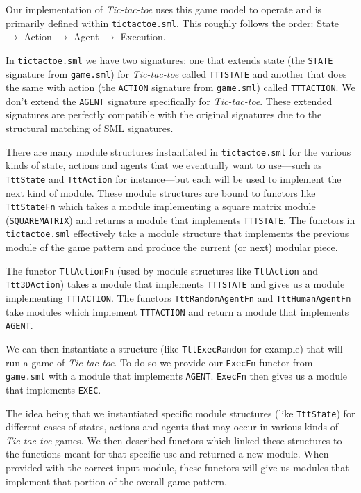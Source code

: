 \documentclass[9pt,letterpaper]{extarticle}
\begin{document}
  Our implementation of \textit{Tic-tac-toe} uses this game model to operate and
  is primarily defined within \texttt{tictactoe.sml}.
  This roughly follows the order:
  State $\rightarrow$ Action $\rightarrow$ Agent $\rightarrow$ Execution.

  In \texttt{tictactoe.sml} we have two signatures: one that extends state
  (the \texttt{STATE} signature from \texttt{game.sml}) for \textit{Tic-tac-toe}
  called \texttt{TTTSTATE} and another that does the same with action
  (the \texttt{ACTION} signature from \texttt{game.sml}) called
  \texttt{TTTACTION}.
  We don't extend the \texttt{AGENT} signature specifically for \textit{Tic-tac-toe}.
  These extended signatures are perfectly compatible with the original signatures
  due to the structural matching of SML signatures. 

  There are many module structures instantiated in \texttt{tictactoe.sml}
  for the various kinds of state, actions and agents that we eventually want to
  use---such as \texttt{TttState} and \texttt{TttAction} for instance---but each will
  be used to implement the next kind of module.
  These module structures are bound to functors like \texttt{TttStateFn} which
  takes a module implementing a square matrix module (\texttt{SQUAREMATRIX})
  and returns a module that implements \texttt{TTTSTATE}. The functors in
  \texttt{tictactoe.sml} effectively take a module structure that implements the
  previous module of the game pattern and produce the current (or next)
  modular piece.
  
  The functor \texttt{TttActionFn} (used by module structures like
  \texttt{TttAction} and \texttt{Ttt3DAction}) takes a module that implements
  \texttt{TTTSTATE} and gives us a module implementing \texttt{TTTACTION}.
  The functors \texttt{TttRandomAgentFn} and \texttt{TttHumanAgentFn} take
  modules which implement \texttt{TTTACTION} and return a module that implements
  \texttt{AGENT}.

  We can then instantiate a structure (like \texttt{TttExecRandom} for example)
  that will run a game of \textit{Tic-tac-toe}.
  To do so we provide our \texttt{ExecFn} functor from
  \texttt{game.sml} with a module that implements \texttt{AGENT}.
  \texttt{ExecFn} then gives us a module that implements \texttt{EXEC}.
  
  The idea being that we instantiated specific module structures
  (like \texttt{TttState}) for different cases of states, actions and agents
  that may occur in various kinds of \textit{Tic-tac-toe} games.
  We then described functors which linked these structures to the functions
  meant for that specific use and returned a new module.
  When provided with the correct input module, these functors will give us
  modules that implement that portion of the overall game pattern.
\end{document}

